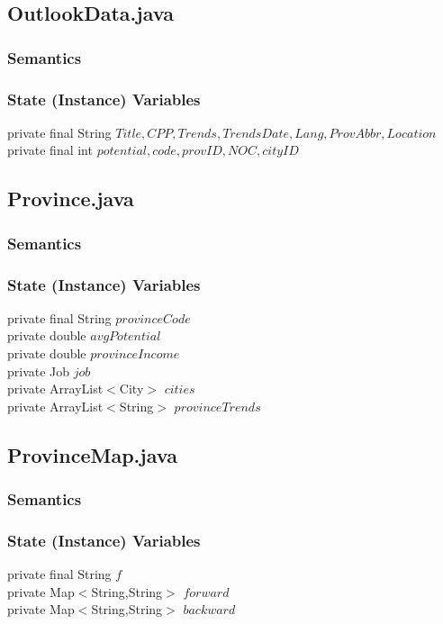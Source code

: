 \documentclass[12pt,fleqn]{article}
\begin{document}
\subsection*{OutlookData.java}\label{poutlookd}

\subsubsection*{Semantics}
\subsubsection*{State (Instance) Variables}
	private final String $Title,CPP,Trends,TrendsDate,Lang,ProvAbbr,Location$\\
	private final int $potential,code,provID, NOC, cityID$\\





\subsection*{Province.java}\label{pprov}

\subsubsection*{Semantics}
\subsubsection*{State (Instance) Variables}
	private final String $provinceCode$\\
	private double $avgPotential$\\
	private double $provinceIncome$\\
	private Job $job$\\
	private ArrayList$<$City$>$ $cities$\\
	private ArrayList$<$String$>$ $provinceTrends$\\


\subsection*{ProvinceMap.java}\label{pprovmap}

\subsubsection*{Semantics}
\subsubsection*{State (Instance) Variables}
	private final String $f$\\
	private Map$<$String,String$>$ $forward$\\
	private Map$<$String,String$>$ $backward$\\
\end{document}
